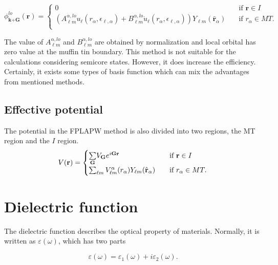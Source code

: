 \documentclass[a4paper, 12pt, titlepage,oneside,drop]{kthesis}
\begin{document}
\begin{equation}\label{lap6}
\phi^{lo}_\textbf{k+G} (\textbf{r}) = 
\begin{cases} 0 & \quad \mbox{if $\textbf{r} \in {I} $}
\\
(A _{{\ell}m}^{\alpha,lo}  u_{{\ell}}(r_{\alpha}, \epsilon_{\ell,\alpha}) + B _{{\ell}m}^{\alpha,lo}  \dot{u}_{{\ell}}(r_{\alpha}, \epsilon_{\ell,\alpha}) ){Y_{{\ell}m}(\hat{\textbf{r}}_{\alpha})} & \quad \mbox{if $r_{\alpha} \in MT. $}\\ 
\end{cases}
\end{equation}
 
The value of $A _{{\ell}m}^{\alpha,lo}$ and $B _{{\ell}m}^{\alpha,lo}$ are obtained by normalization and local orbital has zero value at the muffin tin boundary. This method is not suitable for the calculations considering semicore states.
However, it does increase the efficiency. Certainly, it exists some types of basis function which can mix the advantages from mentioned methods.

\subsection{Effective potential}

\label{epote}
The potential in the FPLAPW method is also divided into two regions, the MT region and the $I$ region.
\begin{equation*}\label{lap7}
V(\textbf{r}) = 
\begin{cases} \sumg<{\textbf G}> V_{\textbf G} e^{i {\textbf G} {\textbf {r}  }} & \quad \mbox{if $\textbf{r} \in {I} $}
\\
 \sum_{{\ell}m} V_{{\ell}m}^{\alpha} (r_{\alpha}) Y_{{\ell}m}(\hat{{\textbf r}}_{\alpha})  & \quad \mbox{if $r_{\alpha} \in MT. $}\\ 
\end{cases}
\end{equation*}

\section{Dielectric function}
The dielectric function describes the optical property of materials. Normally, it is written as $\varepsilon(\omega)$, which has two parts

\begin{equation}
 \varepsilon(\omega) = \varepsilon_1(\omega) + i \varepsilon_2(\omega).
\end{equation}
\end{document}

